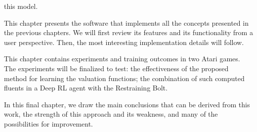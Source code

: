 \begin{description}[style=nextline]
		this model.
	\item[\ref{ch:atarieyes}~--~\nameref{ch:atarieyes}]
		This chapter presents the software that implements all the concepts
		presented in the previous chapters. We will first review its features and
		its functionality from a user perspective. Then, the most interesting
		implementation details will follow.
	\item[\ref{ch:experiments}~--~\nameref{ch:experiments}]
		This chapter contains experiments and training outcomes in two Atari
		games. The experiments will be finalized to test: the effectiveness of the
		proposed method for learning the valuation functions; the combination of
		such computed fluents in a Deep RL agent with the Restraining Bolt.
	\item[\ref{ch:conclusions}~--~\nameref{ch:conclusions}]
		In this final chapter, we draw the main conclusions that can be derived
		from this work, the strength of this approach and its weakness, and many
		of the possibilities for improvement.
\end{description}


